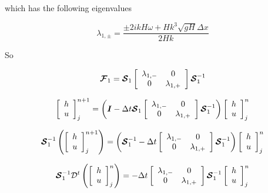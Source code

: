 \documentclass[12pt]{article}
\begin{document}
which has the following eigenvalues

\[\lambda_{1,\pm} = \frac{\pm2ikH\omega + Hk^3\sqrt{gH} \Delta x}{2Hk}\]

So 

\[\boldsymbol{\mathcal{F}}_1 = \boldsymbol{\mathcal{S}}_1 \left[\begin{array}{c c}
\lambda_{1,-}  & 0 \\0  & \lambda_{1,+}
\end{array}\right] \boldsymbol{\mathcal{S}}_1^{-1}  \]


\[\left[\begin{array}{c}
h \\ u
\end{array}\right]^{n+1}_j = \left(\boldsymbol{I} - \Delta t\boldsymbol{\mathcal{S}}_1 \left[\begin{array}{c c}
\lambda_{1,-}  & 0 \\0  & \lambda_{1,+}
\end{array}\right] \boldsymbol{\mathcal{S}}_1^{-1}  \right)\left[\begin{array}{c}
h \\ u
\end{array}\right]^{n}_j  \]


\[\boldsymbol{\mathcal{S}}_1^{-1} \left(\left[\begin{array}{c}
h \\ u
\end{array}\right]^{n+1}_j \right) = \left(\boldsymbol{\mathcal{S}}_1^{-1} - \Delta t \left[\begin{array}{c c}
\lambda_{1,-}  & 0 \\0  & \lambda_{1,+}
\end{array}\right] \boldsymbol{\mathcal{S}}_1^{-1}\right)\left[\begin{array}{c}
h \\ u
\end{array}\right]^{n}_j  \]

\[\boldsymbol{\mathcal{S}}_1^{-1} \mathcal{D}^t\left(\left[\begin{array}{c}
h \\ u
\end{array}\right]^{n}_j \right) = - \Delta t \left[\begin{array}{c c}
\lambda_{1,-}  & 0 \\0  & \lambda_{1,+}
\end{array}\right] \boldsymbol{\mathcal{S}}_1^{-1}\left[\begin{array}{c}
h \\ u
\end{array}\right]^{n}_j  \]
\end{document}
